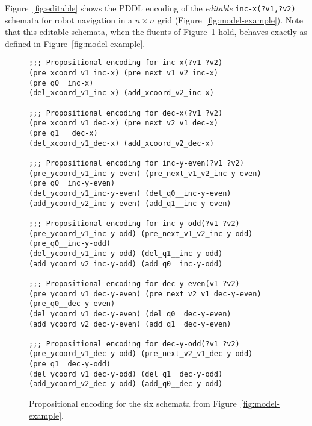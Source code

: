 \documentclass[letterpaper]{article} %
\begin{document}
Figure~\ref{fig:editable} shows the PDDL encoding of the {\em editable} {\tt\small inc-x(?v1,?v2)} schemata for robot navigation in a $n\times n$ grid (Figure~\ref{fig:model-example}). Note that this editable schemata, when the fluents of Figure~\ref{fig:encoding} hold, behaves exactly as defined in Figure~\ref{fig:model-example}. 

\begin{figure}
\begin{tiny}
\begin{verbatim}
;;; Propositional encoding for inc-x(?v1 ?v2)
(pre_xcoord_v1_inc-x) (pre_next_v1_v2_inc-x) 
(pre_q0__inc-x)
(del_xcoord_v1_inc-x) (add_xcoord_v2_inc-x)

;;; Propositional encoding for dec-x(?v1 ?v2)
(pre_xcoord_v1_dec-x) (pre_next_v2_v1_dec-x) 
(pre_q1___dec-x)
(del_xcoord_v1_dec-x) (add_xcoord_v2_dec-x)

;;; Propositional encoding for inc-y-even(?v1 ?v2)
(pre_ycoord_v1_inc-y-even) (pre_next_v1_v2_inc-y-even)
(pre_q0__inc-y-even)
(del_ycoord_v1_inc-y-even) (del_q0__inc-y-even)
(add_ycoord_v2_inc-y-even) (add_q1__inc-y-even)

;;; Propositional encoding for inc-y-odd(?v1 ?v2)
(pre_ycoord_v1_inc-y-odd) (pre_next_v1_v2_inc-y-odd) 
(pre_q0__inc-y-odd)
(del_ycoord_v1_inc-y-odd) (del_q1__inc-y-odd)
(add_ycoord_v2_inc-y-odd) (add_q0__inc-y-odd)

;;; Propositional encoding for dec-y-even(v1 ?v2)
(pre_ycoord_v1_dec-y-even) (pre_next_v2_v1_dec-y-even)
(pre_q0__dec-y-even)
(del_ycoord_v1_dec-y-even) (del_q0__dec-y-even)
(add_ycoord_v2_dec-y-even) (add_q1__dec-y-even)

;;; Propositional encoding for dec-y-odd(?v1 ?v2)
(pre_ycoord_v1_dec-y-odd) (pre_next_v2_v1_dec-y-odd)
(pre_q1__dec-y-odd)
(del_ycoord_v1_dec-y-odd) (del_q1__dec-y-odd)
(add_ycoord_v2_dec-y-odd) (add_q0__dec-y-odd)
\end{verbatim}
\end{tiny}
 \caption{\small Propositional encoding for the six schemata from Figure~\ref{fig:model-example}.}
\label{fig:encoding}
\end{figure}
\end{document}
